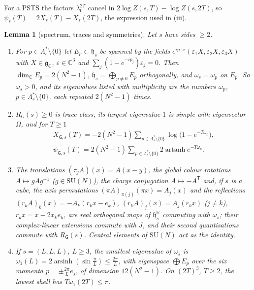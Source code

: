 \documentclass[11pt,a4paper]{amsart}
\newtheorem{lemma}[theorem]{Lemma}
\theoremstyle{definition}
\theoremstyle{remark}
\numberwithin{equation}{section}
\newcommand{\R}{\mathbb{R}}          %
\newcommand{\C}{\mathbb{C}}          %
\newcommand{\SU}{\mathrm{SU}}              %
\newcommand{\PSTS}{\textup{PSTS}}          %
\newcommand{\TT}{\mathbb{T}}               %
\newcommand{\Zpart}[2]{Z(#1,#2)}           %
\newcommand{\Zc}{\mathcal{Z}}              %
\newcommand{\XT}[2]{X_{#1}(#2)}            %
\newcommand{\psiT}[2]{\psi_{#1}(#2)}       %
\newcommand{\cube}[1]{(2#1)^3}             %
\newcommand{\lzero}{\lambda_0}             %
\newcommand{\Gharm}{\mathsf{G}}            %
\begin{document}
For a \PSTS{} the factors $\lzero^{2T}$ cancel in $2\log\Zpart{s}{T}-\log\Zpart{s}{2T}$, so $\psiT{s}{T}=2\XT{s}{T}-\XT{s}{2T}$, the expression used in (iii).

\begin{lemma}[spectrum, traces and symmetries]\label{lem:harmonic-spectrum}
Let $s$ have sides $\ge2$.
\begin{enumerate}[label=(\roman*)]
\item For $p\in\Lambda_s^*\setminus\{0\}$ let $E_p\subset\mathfrak h_s$ be spanned by the fields $e^{ip\cdot x}(\varepsilon_1X,\varepsilon_2X,\varepsilon_3X)$ with $X\in\mathfrak g_\C$, $\varepsilon\in\C^3$ and $\sum_j(1-e^{-ip_j})\varepsilon_j=0$. Then $\dim_\C E_p=2(N^2-1)$, $\mathfrak h_s=\bigoplus_{p\ne0}E_p$ orthogonally, and $\omega_s=\omega_p$ on $E_p$. So $\omega_s>0$, and its eigenvalues listed with multiplicity are the numbers $\omega_p$, $p\in\Lambda_s^*\setminus\{0\}$, each repeated $2(N^2-1)$ times.
\item $R_{\Gharm}(s)\ge0$ is trace class, its largest eigenvalue $1$ is simple with eigenvector $\Omega$, and for $T\ge1$
\begin{equation}\label{eq:harmonic-traces}
\begin{gathered}
 \XT{\Gharm,s}{T}=-2(N^2-1)\sum_{p\in\Lambda_s^*\setminus\{0\}}\log\bigl(1-e^{-T\omega_p}\bigr),\\
 \psiT{\Gharm,s}{T}=2(N^2-1)\sum_{p\in\Lambda_s^*\setminus\{0\}}2\operatorname{artanh}e^{-T\omega_p} .
\end{gathered}
\end{equation}
\item The translations $(\tau_yA)(x)=A(x-y)$, the global colour rotations $A\mapsto gAg^{-1}$ ($g\in\SU(N)$), the charge conjugation $A\mapsto-A^{\mathsf T}$ and, if $s$ is a cube, the axis permutations $(\pi A)_{\pi(j)}(\pi x)=A_j(x)$ and the reflections $(r_kA)_k(x)=-A_k(r_kx-e_k)$, $(r_kA)_j(x)=A_j(r_kx)$ ($j\ne k$), $r_kx=x-2x_ke_k$, are real orthogonal maps of $\mathfrak h^{\R}_s$ commuting with $\omega_s$; their complex-linear extensions commute with $J$, and their second quantisations commute with $R_{\Gharm}(s)$. Central elements of $\SU(N)$ act as the identity.
\item If $s=(L,L,L)$, $L\ge3$, the smallest eigenvalue of $\omega_s$ is $\omega_1(L)=2\operatorname{arsinh}(\sin\frac\pi L)\le\frac{2\pi}L$, with eigenspace $\bigoplus E_p$ over the six momenta $p=\pm\frac{2\pi}Le_j$, of dimension $12(N^2-1)$. On $\cube{T}$, $T\ge2$, the lowest shell has $T\omega_1(2T)\le\pi$.
\end{enumerate}
\end{lemma}
\end{document}
